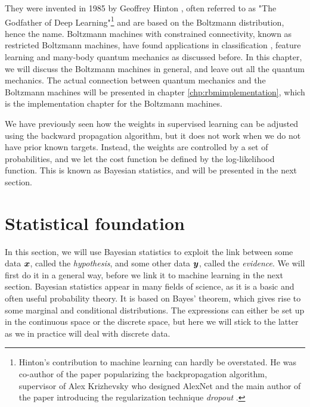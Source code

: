 They were invented in 1985 by Geoffrey Hinton \cite{ackley_learning_1985}, often referred to as "The Godfather of Deep Learning"\footnote{Hinton's contribution to machine learning can hardly be overstated. He was co-author of the paper popularizing the backpropagation algorithm, \cite{rumelhart_learning_1986} supervisor of Alex Krizhevsky who designed AlexNet \cite{krizhevsky_imagenet_2012} and the main author of the paper introducing the regularization technique \textit{dropout} \cite{hinton_improving_2012}.} and are based on the Boltzmann distribution, hence the name. Boltzmann machines with constrained connectivity, known as restricted Boltzmann machines, have found applications in classification \cite{larochelle_classification_2008}, feature learning \cite{coates_analysis_2011} and many-body quantum mechanics \cite{carleo_solving_2017} as discussed before. In this chapter, we will discuss the Boltzmann machines in general, and leave out all the quantum mechanics. The actual connection between quantum mechanics and the Boltzmann machines will be presented in chapter \ref{chp:rbmimplementation}, which is the implementation chapter for the Boltzmann machines.

We have previously seen how the weights in supervised learning can be adjusted using the backward propagation algorithm, but it does not work when we do not have prior known targets. Instead, the weights are controlled by a set of probabilities, and we let the cost function be defined by the log-likelihood function. This is known as Bayesian statistics, and will be presented in the next section.

\section{Statistical foundation} \label{sec:bayes}
In this section, we will use Bayesian statistics to exploit the link between some data $\boldsymbol{{x}}$, called the \textit{hypothesis}, and some other data $\boldsymbol{{y}}$, called the \textit{evidence}.  We will first do it in a general way, before we link it to machine learning in the next section. Bayesian statistics appear in many fields of science, as it is a basic and often useful probability theory. It is based on Bayes' theorem, which gives rise to some marginal and conditional distributions. The expressions can either be set up in the continuous space or the discrete space, but here we will stick to the latter as we in practice will deal with discrete data. 

